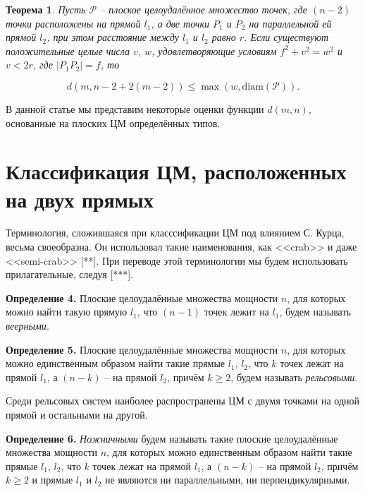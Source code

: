 \documentclass[12pt]{article}
\theoremstyle{theorem}
\newtheorem{theorem}{Теорема}
\theoremstyle{dfn}
\theoremstyle{remark}
\begin{document}
\begin{theorem}
	Пусть $\mathcal{P}$ -- плоское целоудалённое множество точек,
	где $(n - 2)$ точки  расположены на прямой $l_{1}$, а две точки
	$P_{1}$ и  $P_{2}$ на параллельной ей прямой $l_{2}$, при этом расстояние
	между $l_{1}$ и $l_{2}$ равно $r$. Если существуют положительные целые числа
	$v$, $w$, удовлетворяющие условиям $f^{2} + v^{2}
	= w^{2}$ и $v < 2r$, где $|P_{1}P_{2}| = f$,
	то

	\begin{equation}\label{formula1}
		d(m, n - 2 + 2(m - 2)) \leq \max(w, \operatorname{diam(\mathcal{P})})
		.
	\end{equation}

\end{theorem}

В данной статье мы представим некоторые оценки функции $d(m,n)$, основанные на плоских ЦМ определённых типов.

\section{Классификация ЦМ, расположенных на двух прямых}


Терминология, сложившаяся при класссификации ЦМ под влиянием С. Курца, весьма своеобразна.
Он использовал такие наименования, как
<<crab>> и даже <<semi-crab>> [**]. %
При переводе этой терминологии мы будем использовать прилагательные, следуя [***]. %

\par
\textbf{Определение 4.}
Плоские целоудалённые множества мощности $n$, для которых можно найти такую прямую $l_1$, что
$(n - 1)$ точек лежит на $l_1$, будем называть \textit{веерными}.

\par
\textbf{Определение 5.}
Плоские целоудалённые множества мощности $n$, для которых можно единственным образом найти такие прямые $l_1$, $l_2$,
что $k$ точек лежат на прямой $l_1$, а $(n - k)$ -- на прямой $l_2$, причём $k \geq 2$, будем называть \textit{рельсовыми}.

Среди рельсовых систем наиболее распространены ЦМ с двумя точками на одной прямой и остальными на другой.

\par
\textbf{Определение 6.}
\textit{Ножничными} будем называть такие плоские целоудалённые множества мощности $n$, для которых можно единственным
образом найти такие прямые $l_1$, $l_2$, что $k$ точек лежат на прямой $l_1$, а $(n - k)$ -- на прямой $l_2$, причём $k \geq 2$ и
прямые $l_1$ и $l_2$ не являются ни параллельными, ни перпендикулярными.
\end{document}
